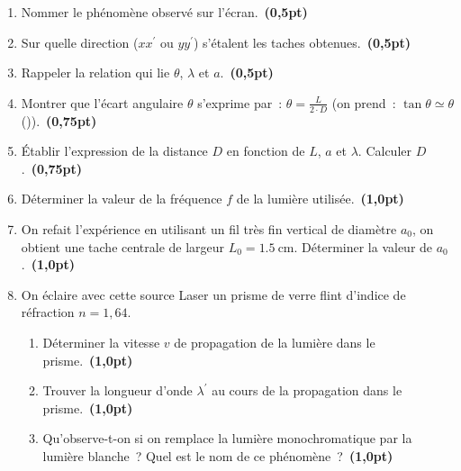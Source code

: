 \begin{enumerate}
    \item Nommer le phénomène observé sur l'écran.~\textbf{(0,5pt)}
    \item Sur quelle direction ($xx^{\prime}$ ou $yy^{\prime}$) s’étalent les
          taches obtenues.~\textbf{(0,5pt)}
    \item Rappeler la relation qui lie  $\theta$, $\lambda$ et $a$.~\textbf{(0,5pt)}
    \item Montrer que l'écart angulaire $\theta$ s'exprime par~:
          $\theta=\frac{L}{2 \cdot D}$
          (on prend~: $\tan\theta \simeq \theta$ (\unit{\rad})).~\textbf{(0,75pt)}
    \item Établir l'expression de la distance $D$ en fonction de $L$, $a$ 
          et $\lambda$. Calculer $D$.~\textbf{(0,75pt)}
    \item Déterminer la valeur de la fréquence $f$ de la lumière utilisée.~\textbf{(1,0pt)}
    \item On refait l'expérience en utilisant un fil très fin vertical de
          diamètre $a_0$, on obtient une tache centrale de largeur
          $L_0=\qty{1.5}{\cm}$. Déterminer la valeur de $a_0$.~\textbf{(1,0pt)}
    \item On éclaire avec cette source Laser un prisme de verre flint d'indice
          de réfraction $n=1,64$. 
          \begin{enumerate}
              \item Déterminer la vitesse $v$ de propagation de la lumière dans
                    le prisme.~\textbf{(1,0pt)}
              \item Trouver la longueur d’onde $\lambda^{\prime}$ au cours de la
                    propagation dans le prisme.~\textbf{(1,0pt)}
              \item Qu'observe-t-on si on remplace la lumière monochromatique
                    par la lumière blanche~? Quel est le nom de ce phénomène~?~\textbf{(1,0pt)}
          \end{enumerate}
\end{enumerate}

